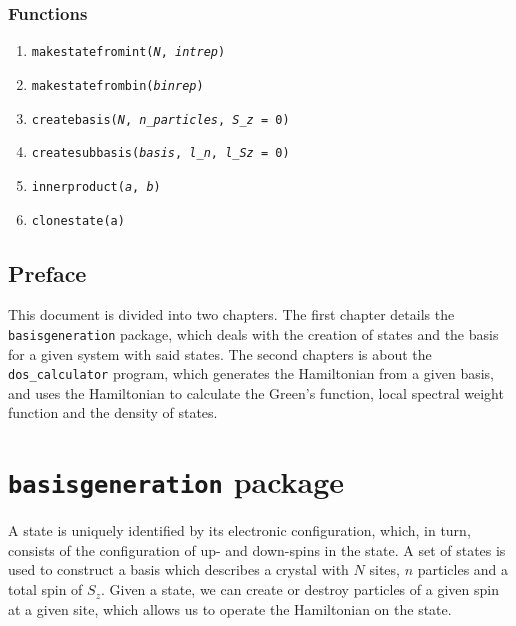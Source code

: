 \documentclass[]{book}
\begin{document}
\subsection*{Functions}

\begin{enumerate}
\item \texttt{makestatefromint(\textit{N}, \textit{intrep})}
\item \texttt{makestatefrombin(\textit{binrep})}
\item \texttt{createbasis(\textit{N}, \textit{n\_particles}, \textit{S\_z} = 0)}
\item \texttt{createsubbasis(\textit{basis}, \textit{l\_n}, \textit{l\_Sz} = 0)}
\item \texttt{innerproduct(\textit{a}, \textit{b})}
\item \texttt{clonestate(a)}
\end{enumerate}

\newpage
\section*{Preface}
This document is divided into two chapters. The first chapter details the \texttt{basisgeneration} package, which deals with the creation of states and the basis for a given system with said states. The second chapters is about the \texttt{dos\_calculator} program, which generates the Hamiltonian from a given basis, and uses the Hamiltonian to calculate the Green's function, local spectral weight function and the density of states.

\tableofcontents

\mainmatter

\chapter{\texttt{basisgeneration} package}
A state is uniquely identified by its electronic configuration, which, in turn, consists of the configuration of up- and down-spins in the state. A set of states is used to construct a basis which describes a crystal with $N$ sites, $n$ particles and a total spin of $S_z$. Given a state, we can create or destroy particles of a given spin at a given site, which allows us to operate the Hamiltonian on the state.
\end{document}
